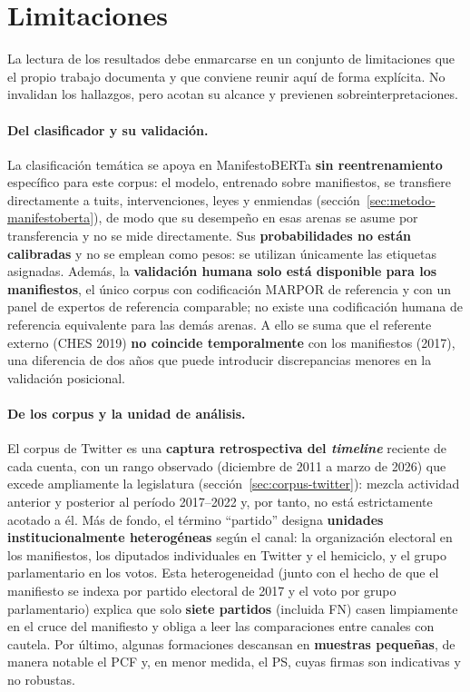 \section{Limitaciones}
\label{sec:disc-limitaciones}

La lectura de los resultados debe enmarcarse en un conjunto de limitaciones que el
propio trabajo documenta y que conviene reunir aquí de forma explícita. No
invalidan los hallazgos, pero acotan su alcance y previenen sobreinterpretaciones.

\paragraph{Del clasificador y su validación.}
La clasificación temática se apoya en ManifestoBERTa \textbf{sin reentrenamiento}
específico para este corpus: el modelo, entrenado sobre manifiestos, se transfiere
directamente a tuits, intervenciones, leyes y enmiendas
(sección~\ref{sec:metodo-manifestoberta}), de modo que su desempeño en esas arenas
se asume por transferencia y no se mide directamente. Sus \textbf{probabilidades
no están calibradas} y no se emplean como pesos: se utilizan únicamente las
etiquetas asignadas. Además, la \textbf{validación humana solo está disponible
para los manifiestos}, el único corpus con codificación MARPOR de referencia y con
un panel de expertos de referencia comparable; no existe una codificación humana
de referencia equivalente para las demás arenas. A ello se suma que el referente externo (CHES
2019) \textbf{no coincide temporalmente} con los manifiestos (2017), una
diferencia de dos años que puede introducir discrepancias menores en la validación
posicional.

\paragraph{De los corpus y la unidad de análisis.}
El corpus de Twitter es una \textbf{captura retrospectiva del \emph{timeline}}
reciente de cada cuenta, con un rango observado (diciembre de 2011 a marzo de
2026) que excede ampliamente la legislatura
(sección~\ref{sec:corpus-twitter}): mezcla actividad anterior y posterior al
período 2017--2022 y, por tanto, no está estrictamente acotado a él.
Más de fondo, el término ``partido'' designa \textbf{unidades institucionalmente
heterogéneas} según el canal: la organización electoral en los manifiestos, los
diputados individuales en Twitter y el hemiciclo, y el grupo parlamentario en los
votos. Esta heterogeneidad (junto con el hecho de que el manifiesto se indexa
por partido electoral de 2017 y el voto por grupo parlamentario) explica que
solo \textbf{siete partidos} (incluida FN) casen limpiamente en el cruce del
manifiesto y obliga a leer las comparaciones entre canales con cautela. Por
último, algunas formaciones descansan en \textbf{muestras pequeñas}, de manera
notable el PCF y, en menor medida, el PS, cuyas firmas son indicativas y no
robustas.

